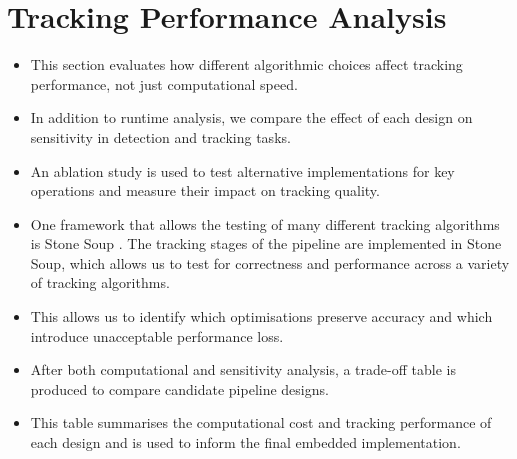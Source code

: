 \section{Tracking Performance Analysis}

\begin{itemize}
    \item This section evaluates how different algorithmic choices affect tracking performance, not just computational speed.
    \item In addition to runtime analysis, we compare the effect of each design on sensitivity in detection and tracking tasks.
    \item An ablation study is used to test alternative implementations for key operations and measure their impact on tracking quality.
    \item One framework that allows the testing of many different tracking algorithms is Stone Soup \cite{}. The tracking stages of the pipeline are implemented in Stone Soup, which allows us to test for correctness and performance across a variety of tracking algorithms.
    \item This allows us to identify which optimisations preserve accuracy and which introduce unacceptable performance loss.
    \item After both computational and sensitivity analysis, a trade-off table is produced to compare candidate pipeline designs.
    \item This table summarises the computational cost and tracking performance of each design and is used to inform the final embedded implementation.
\end{itemize}